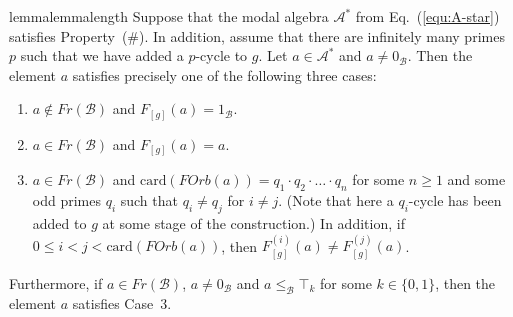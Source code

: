 \documentclass[a4paper,UKenglish,cleveref, autoref, thm-restate]{lipics-v2021}
\begin{document}
\begin{restatable}{lemma}{lemmalength}\label{lemma:length}
	Suppose that the modal algebra $\mathcal{A}^{\ast}$ from Eq.~(\ref{equ:A-star}) satisfies Property~(\#). In addition, assume that there are infinitely many primes $p$ such that we have added a $p$-cycle to $g$. Let $a \in \mathcal{A}^{\ast}$ and $a \neq 0_{\mathcal{B}}$. Then the element $a$ satisfies precisely one of the following three cases:
	\begin{enumerate}
		\item $a\not\in Fr(\mathcal{B})$ and $F_{[g]}(a) = 1_{\mathcal{B}}$.
		
		\item $a \in Fr(\mathcal{B})$ and $F_{[g]}(a) = a$.
		
		\item $a\in Fr(\mathcal{B})$ and $\mathrm{card}(FOrb(a)) = q_1\cdot q_2\cdot \ldots\cdot  q_n$ for some $n\geq 1$ and some odd primes $q_i$ such that $q_i \neq q_j$ for $i\neq j$. (Note that here a $q_i$-cycle has been added to $g$ at some stage of the construction.) In addition, if $0\leq i < j < \mathrm{card}(FOrb(a))$, then $F_{[g]}^{(i)}(a) \neq F_{[g]}^{(j)}(a)$. 
	\end{enumerate}
	Furthermore, if $a\in Fr(\mathcal{B})$, $a\neq 0_{\mathcal{B}}$ and $a \leq_{\mathcal{B}} \top_k$ for some $k\in\{ 0,1\}$, then the element $a$ satisfies Case~3.
\end{restatable}
\end{document}
